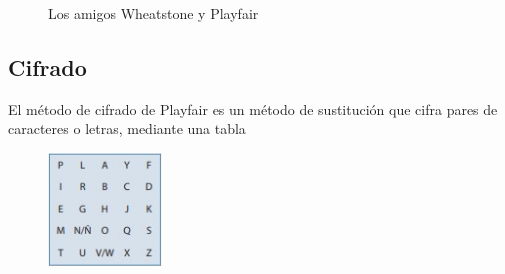 \documentclass[10pt]{article}
\begin{document}
\begin{figure}[h]
  \centering
  \qquad
  \caption{Los amigos Wheatstone y Playfair}
  \label{fig:example}%
\end{figure}
\newpage

\subsection{Cifrado}
El método de cifrado de Playfair es un método de sustitución que cifra pares de caracteres o letras, mediante
una tabla
\begin{figure}[h]
  \centering
  \includegraphics[height=3cm]{playfairKey}
\end{figure}
\end{document}
